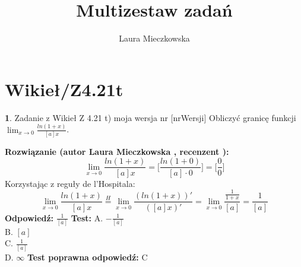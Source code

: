 \documentclass[12pt, a4paper]{article}
\title{Multizestaw zadań}
\author{Laura Mieczkowska}
\date{}
\theoremstyle{definition} %
\newtheorem{zad}{}
\newcommand{\kategoria}[1]{\section{#1}} %
\newcommand{\zadStart}[1]{\begin{zad}#1\newline} %
\newcommand{\zadStop}{\end{zad}}   %
\newcommand{\rozwStart}[2]{\noindent \textbf{Rozwiązanie (autor #1 , recenzent #2): }\newline} %
\newcommand{\odpStart}{\noindent \textbf{Odpowiedź:}\newline}    %
\newcommand{\odpStop}{\newline}                                             %
\newcommand{\testStart}{\noindent \textbf{Test:}\newline} %
\newcommand{\testStop}{\newline} %
\newcommand{\kluczStart}{\noindent \textbf{Test poprawna odpowiedź:}\newline} %
\newcommand{\kluczStop}{\newline} %
\begin{document}
\maketitle


\kategoria{Wikieł/Z4.21t}
\zadStart{Zadanie z Wikieł Z 4.21 t) moja wersja nr [nrWersji]}
Obliczyć granicę funkcji $\lim_{x \to 0}\frac{ln(1+x)}{[a]x}$.
\zadStop
\rozwStart{Laura Mieczkowska}{}
$$\lim_{x \to 0}\frac{ln(1+x)}{[a]x}=\bigg[\frac{ln(1+0)}{[a]\cdot 0}\bigg]=\bigg[\frac{0}{0}\bigg]$$
Korzystając z reguły de l'Hospitala:
$$\lim_{x \to 0}\frac{ln(1+x)}{[a]x}\stackrel{H}{=}
\lim_{x \to 0}\frac{(ln(1+x))'}{([a]x)'}=\lim_{x \to 0}\frac{\frac{1}{1+x}}{[a]}=\frac{1}{[a]}$$
\odpStart
$\frac{1}{[a]}$
\odpStop
\testStart
A. $-\frac{1}{[a]}$ \\
B. $[a]$ \\
C. $\frac{1}{[a]}$ \\
D. $\infty$ 
\testStop
\kluczStart
C
\kluczStop
\end{document}
